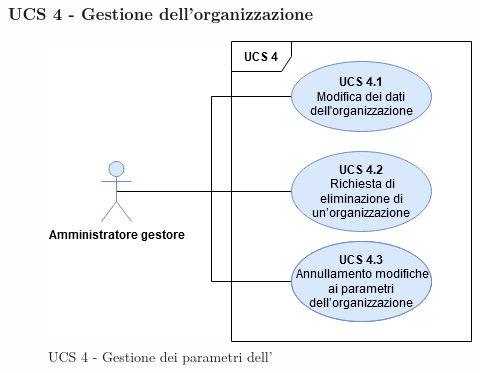 \subsubsection{UCS 4 - Gestione dell'organizzazione}%

\begin{figure}[h]
	\centering	
	\includegraphics[scale=0.53]{Sezioni/UseCase/Immagini/UCS4.png}
	\caption{UCS 4 - Gestione dei parametri dell'}
\end{figure}

